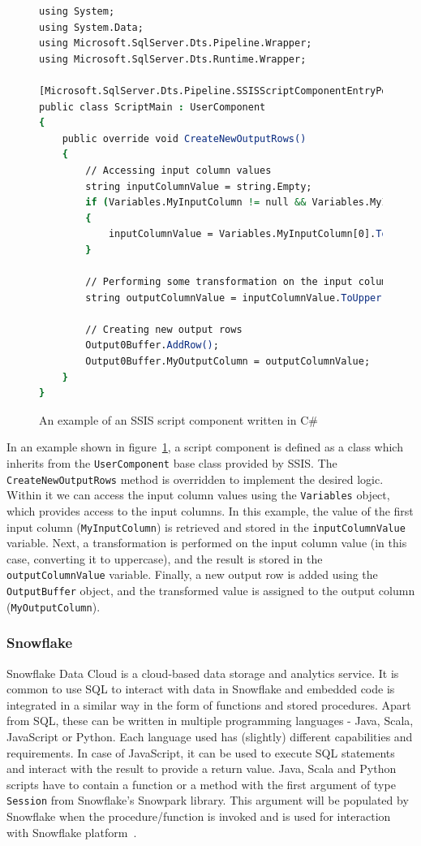 \begin{figure}[ht]
\begin{lstlisting}[language=csh]
using System;
using System.Data;
using Microsoft.SqlServer.Dts.Pipeline.Wrapper;
using Microsoft.SqlServer.Dts.Runtime.Wrapper;

[Microsoft.SqlServer.Dts.Pipeline.SSISScriptComponentEntryPointAttribute]
public class ScriptMain : UserComponent
{
    public override void CreateNewOutputRows()
    {
        // Accessing input column values
        string inputColumnValue = string.Empty;
        if (Variables.MyInputColumn != null && Variables.MyInputColumn.Length > 0)
        {
            inputColumnValue = Variables.MyInputColumn[0].ToString();
        }

        // Performing some transformation on the input column value
        string outputColumnValue = inputColumnValue.ToUpper();

        // Creating new output rows
        Output0Buffer.AddRow();
        Output0Buffer.MyOutputColumn = outputColumnValue;
    }
}
\end{lstlisting}
\caption{An example of an SSIS script component written in C\#}
\label{fig:cSharpScript}
\end{figure}

\par
In an example shown in figure~\ref{fig:cSharpScript}, a script component is defined as a class which inherits from the \texttt{UserComponent} base class provided by SSIS. The \texttt{CreateNewOutputRows} method is overridden to implement the desired logic. Within it we can access the input column values using the \texttt{Variables} object, which provides access to the input columns. In this example, the value of the first input column (\texttt{MyInputColumn}) is retrieved and stored in the \texttt{inputColumnValue} variable. Next, a transformation is performed on the input column value (in this case, converting it to uppercase), and the result is stored in the \texttt{outputColumnValue} variable. Finally, a new output row is added using the \texttt{OutputBuffer} object, and the transformed value is assigned to the output column (\texttt{MyOutputColumn}).

\subsubsection{Snowflake}
Snowflake Data Cloud is a cloud-based data storage and analytics service. It is common to use SQL to interact with data in Snowflake and embedded code is integrated in a similar way in the form of functions and stored procedures. Apart from SQL, these can be written in multiple programming languages - Java, Scala, JavaScript or Python. Each language used has (slightly) different capabilities and requirements. In case of JavaScript, it can be used to execute SQL statements and interact with the result to provide a return value. Java, Scala and Python scripts have to contain a function or a method with the first argument of type \texttt{Session} from Snowflake's Snowpark library. This argument will be populated by Snowflake when the procedure/function is invoked and is used for interaction with Snowflake platform~\cite{snowflake}.

